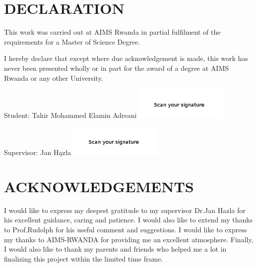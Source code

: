 \chapter*{DECLARATION}
This work was carried out at AIMS Rwanda in partial fulfilment of the requirements for a Master of Science Degree.

I hereby declare that except where due acknowledgement is made, this work has never been presented wholly or in part for the award of a degree at AIMS Rwanda or any other University.

\vspace{1.5cm}
Student: Tahir Mohammed Elamin Adreani \includegraphics[height=1.5cm]{images/signature.png}

\vspace{1.5cm}

Supervisor: Jan Hązła \includegraphics[height=1.5cm]{images/signature1.png}


\newpage

\chapter*{ACKNOWLEDGEMENTS}
I would like to express my deepest gratitude to my supervisor Dr.Jan Hazla for his excellent guidance, caring and patience. I would also like to extend my thanks to Prof.Rudolph for his useful comment and suggestions. I would like to express my thanks to AIMS-RWANDA for providing me an excellent atmosphere. Finally, I would also like to thank my parents and friends who helped me a lot in finalizing this project within the limited time frame.
%
\newpage
%
